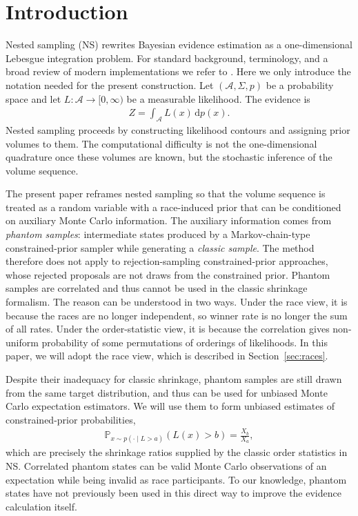 \documentclass[pdflatex,sn-basic,icol]{sn-jnl}
\newcommand{\dd}{\mathrm{d}}
\newcommand{\Prob}{\mathbb{P}}
\theoremstyle{plain}
\theoremstyle{definition}
\begin{document}
\section{Introduction}\label{sec:introduction}

Nested sampling (NS) \citep{2004AIPC..735..395S} rewrites Bayesian evidence estimation as a one-dimensional Lebesgue integration problem.
For standard background, terminology, and a broad review of modern implementations we refer to \citet{2023StSur..17..169B}.
Here we only introduce the notation needed for the present construction.
Let $(\mathcal{A},\Sigma,p)$ be a probability space and let $L:\mathcal{A}\to[0,\infty)$ be a measurable likelihood.
The evidence is
\begin{align}
    Z = \int_\mathcal{A} L(x)\,\dd p(x).\label{eq:Z_lebesgue_new}
\end{align}
Nested sampling proceeds by constructing likelihood contours and assigning prior volumes to them.
The computational difficulty is not the one-dimensional quadrature once these volumes are known, but the stochastic inference of the volume sequence.

The present paper reframes nested sampling so that the volume sequence is treated as a random variable with a race-induced prior that can be conditioned on auxiliary Monte Carlo information.
The auxiliary information comes from \textit{phantom samples}: intermediate states produced by a Markov-chain-type constrained-prior sampler while generating a \textit{classic sample}.
The method therefore does not apply to rejection-sampling constrained-prior approaches, whose rejected proposals are not draws from the constrained prior.
Phantom samples are correlated and thus cannot be used in the classic shrinkage formalism.
The reason can be understood in two ways.
Under the race view, it is because the races are no longer independent, so winner rate is no longer the sum of all rates.
Under the order-statistic view, it is because the correlation gives non-uniform probability of some permutations of orderings of likelihoods.
In this paper, we will adopt the race view, which is described in Section~\ref{sec:races}.

Despite their inadequacy for classic shrinkage, phantom samples are still drawn from the same target distribution, and thus can be used for unbiased Monte Carlo expectation estimators.
We will use them to form unbiased estimates of constrained-prior probabilities,
\begin{align}
    \Prob_{x\sim p(\cdot\mid L>a)}(L(x)>b)=\frac{X_b}{X_a},\label{eq:intro_phantom_identity}
\end{align}
which are precisely the shrinkage ratios supplied by the classic order statistics in NS.
Correlated phantom states can be valid Monte Carlo observations of an expectation while being invalid as race participants.
To our knowledge, phantom states have not previously been used in this direct way to improve the evidence calculation itself.
\end{document}
